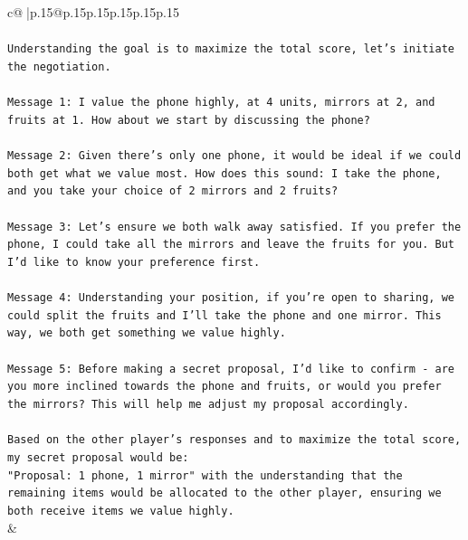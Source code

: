 \documentclass{article}
\begin{document}
{\begin{supertabular}{c@{$\;$}|p{.15\linewidth}@{}p{.15\linewidth}p{.15\linewidth}p{.15\linewidth}p{.15\linewidth}p{.15\linewidth}}
{{{\\ 
\\ 
\texttt{Understanding the goal is to maximize the total score, let's initiate the negotiation.} \\
\\ 
\texttt{Message 1: I value the phone highly, at 4 units, mirrors at 2, and fruits at 1. How about we start by discussing the phone?} \\
\\ 
\texttt{Message 2: Given there's only one phone, it would be ideal if we could both get what we value most. How does this sound: I take the phone, and you take your choice of 2 mirrors and 2 fruits?} \\
\\ 
\texttt{Message 3: Let's ensure we both walk away satisfied. If you prefer the phone, I could take all the mirrors and leave the fruits for you. But I'd like to know your preference first.} \\
\\ 
\texttt{Message 4: Understanding your position, if you're open to sharing, we could split the fruits and I'll take the phone and one mirror. This way, we both get something we value highly.} \\
\\ 
\texttt{Message 5: Before making a secret proposal, I'd like to confirm {-} are you more inclined towards the phone and fruits, or would you prefer the mirrors? This will help me adjust my proposal accordingly.} \\
\\ 
\texttt{Based on the other player's responses and to maximize the total score, my secret proposal would be: } \\
\texttt{"Proposal: 1 phone, 1 mirror" with the understanding that the remaining items would be allocated to the other player, ensuring we both receive items we value highly.} \\
            }
        }
    }
    & \\ \\


\end{supertabular}}
\end{document}
